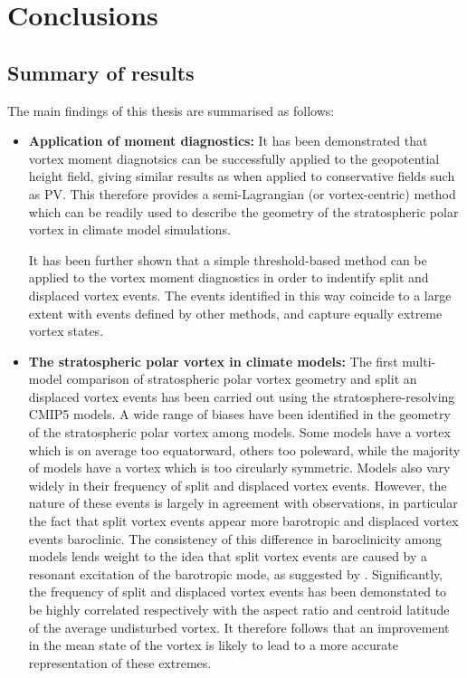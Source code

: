 \chapter{Conclusions}
\label{cha:conclusions}

\section{Summary of results}

The main findings of this thesis are summarised as follows: 
\begin{itemize}
\item\textbf{Application of moment diagnostics:} It has been demonstrated that
  vortex moment diagnotsics can be successfully applied to the geopotential
  height field, giving similar results as when applied to conservative fields
  such as PV. This therefore provides a semi-Lagrangian (or vortex-centric)
  method which can be readily used to describe the geometry of the stratospheric
  polar vortex in climate model simulations.

  It has been further shown that a simple threshold-based method can be applied
  to the vortex moment diagnostics in order to indentify split and displaced
  vortex events. The events identified in this way coincide to a large extent
  with events defined by other methods, and capture equally extreme vortex
  states. 

\item\textbf{The stratospheric polar vortex in climate models:} The first
  multi-model comparison of stratospheric polar vortex geometry and split an
  displaced vortex events has been carried out using the stratosphere-resolving
  CMIP5 models. A wide range of biases have been identified in the geometry of
  the stratospheric polar vortex among models. Some models have a vortex which
  is on average too equatorward, others too poleward, while the majority of
  models have a vortex which is too circularly symmetric. Models also vary
  widely in their frequency of split and displaced vortex events. However, the
  nature of these events is largely in agreement with observations, in
  particular the fact that split vortex events appear more barotropic and
  displaced vortex events baroclinic. The consistency of this difference in
  baroclinicity among models lends weight to the idea that split vortex events
  are caused by a resonant excitation of the barotropic mode, as suggested by
  \citet{Esler2005}. Significantly, the frequency of split and displaced vortex
  events has been demonstated to be highly correlated respectively with the
  aspect ratio and centroid latitude of the average undisturbed vortex. It
  therefore follows that an improvement in the mean state of the vortex is
  likely to lead to a more accurate representation of these extremes.


\end{itemize}
